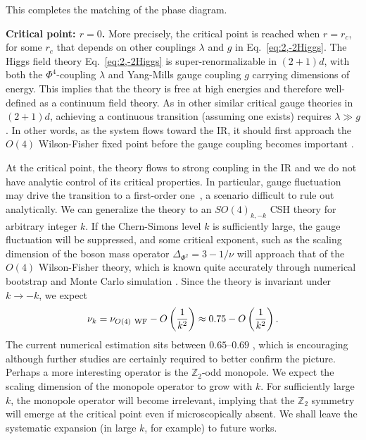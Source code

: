 \documentclass[aps, prl, superscriptaddress, twocolumn,
notitlepage, longbibliography,
floatfix]{revtex4-2}
\newcommand{\1}{\text{\uppercase\expandafter{\romannumeral1}}}
\newcommand{\2}{\text{\uppercase\expandafter{\romannumeral2}}}
\newcommand{\3}{\text{\uppercase\expandafter{\romannumeral3}}}
\newcommand{\4}{\text{\uppercase\expandafter{\romannumeral4}}}
\newcommand{\5}{\text{\uppercase\expandafter{\romannumeral5}}}
\newcommand{\6}{\text{\uppercase\expandafter{\romannumeral6}}}
\def\Z{\mathbb{Z}}
\begin{document}
This completes the matching of the phase diagram.

\textbf{\boldmath Critical point: $r=0$.} More precisely, the critical point is reached when $r=r_c$, for some $r_c$ that depends on other couplings $\lambda$ and $g$ in Eq.~\eqref{eq:2,-2Higgs}. The Higgs field theory Eq.~\eqref{eq:2,-2Higgs} is super-renormalizable in $(2+1)d$, with both the $\Phi^4$-coupling $\lambda$ and Yang-Mills gauge coupling $g$ carrying dimensions of energy. This implies that the theory is free at high energies and therefore well-defined as a continuum field theory. As in other similar critical gauge theories in $(2+1)d$, achieving a continuous transition (assuming one exists) requires $\lambda\gg g$. In other words, as the system flows toward the IR, it should first approach the $O(4)$ Wilson-Fisher fixed point before the gauge coupling becomes important \cite{DasguptaHalperin}.

At the critical point, the theory flows to strong coupling in the IR and we do not have analytic control of its critical properties. In particular, gauge fluctuation may drive the transition to a first-order one~\cite{Coleman1973,Halperin1974}, a scenario difficult to rule out analytically. We can generalize the theory to an $SO(4)_{k,-k}$ CSH theory for arbitrary integer $k$. If the Chern-Simons level $k$ is sufficiently large, the gauge fluctuation will be suppressed, and some critical exponent, such as the scaling dimension of the boson mass operator $\Delta_{\Phi^2}=3-1/\nu$ will approach that of the $O(4)$ Wilson-Fisher theory, which is known quite accurately through numerical bootstrap \cite{O(N)Bootstrap} and Monte Carlo simulation \cite{O(4)MonteCarlo}. Since the theory is invariant under $k\to-k$, we expect
\begin{equation}
\label{eq:largek}
    \nu_k=\nu_{O(4){\rm~WF}}-O\left(\frac{1}{k^2}\right)\approx 0.75-O\left(\frac{1}{k^2}\right).
\end{equation}
The current numerical estimation sits between $0.65$--$0.69$ \cite{SomozaSernaNahum,OppenheimKochJanuszGazitRingel}, which is encouraging although further studies are certainly required to better confirm the picture. Perhaps a more interesting operator is the $\Z_2$-odd monopole. We expect the scaling dimension of the monopole operator to grow with $k$. For sufficiently large $k$, the monopole operator will become irrelevant, implying that the $\Z_2$ symmetry will emerge at the critical point even if microscopically absent. We shall leave the systematic expansion (in large $k$, for example) to future works.
\end{document}

